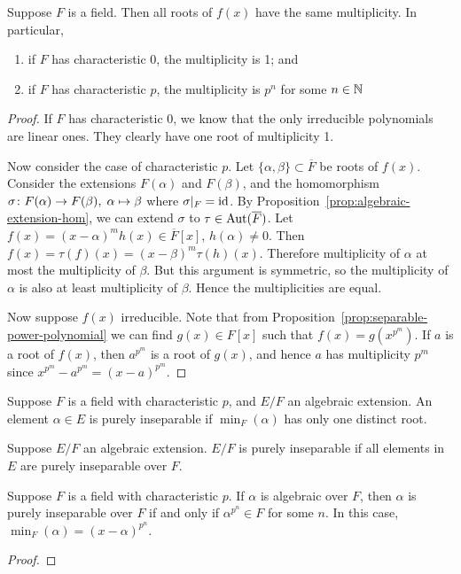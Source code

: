 \begin{proposition}
    Suppose \(F\) is a field.
    Then all roots of \(f(x)\) have the same multiplicity.
    In particular,
    \begin{enumerate}[label={(\alph*)}, itemsep=0mm]
        \item if \(F\) has characteristic 0, the multiplicity is 1; and
        \item if \(F\) has characteristic \(p\),
            the multiplicity is \(p^n\) for some \(n \in \mathbb{N}\)
    \end{enumerate}
\end{proposition}
\begin{proof}
    If \(F\) has characteristic 0,
    we know that the only irreducible polynomials are linear ones.
    They clearly have one root of multiplicity 1.

    Now consider the case of characteristic \(p\).
    Let \(\{\alpha,\beta\}\subset\overline{F}\) be roots of \(f(x)\).
    Consider the extensions \(F(\alpha)\) and \(F(\beta)\),
    and the homomorphism \(\sigma\colon F(\alpha)\to F(\beta),\;\alpha\mapsto\beta\)
    where \(\sigma\vert_F = \operatorname{id}\).
    By Proposition~\ref{prop:algebraic-extension-hom},
    we can extend \(\sigma\) to \(\tau\in\operatorname{Aut}(\overline{F})\).
    Let \(f(x) = {(x-\alpha)}^m h(x) \in \overline{F}[x]\), \(h(\alpha) \neq 0\).
    Then \(f(x) = \tau(f)(x) = {(x-\beta)}^m \tau(h)(x)\).
    Therefore multiplicity of \(\alpha\) at most the multiplicity of \(\beta\).
    But this argument is symmetric,
    so the multiplicity of \(\alpha\) is also at least multiplicity of \(\beta\).
    Hence the multiplicities are equal.

    Now suppose \(f(x)\) irreducible.
    Note that from Proposition~\ref{prop:separable-power-polynomial}
    we can find \(g(x) \in F[x]\) such that \(f(x) = g(x^{p^m})\).
    If \(a\) is a root of \(f(x)\), then \(a^{p^m}\) is a root of \(g(x)\),
    and hence \(a\) has multiplicity \(p^m\)
    since \(x^{p^m} - a^{p^m} = {(x-a)}^{p^m}\).
\end{proof}

\begin{definition}
    Suppose \(F\) is a field with characteristic \(p\),
    and \(E/F\) an algebraic extension.
    An element \(\alpha \in E\) is purely inseparable
    if \(\min_F(\alpha)\) has only one distinct root.
\end{definition}
\begin{definition}
    Suppose \(E/F\) an algebraic extension.
    \(E/F\) is purely inseparable
    if all elements in \(E\) are purely inseparable over \(F\).
\end{definition}
\begin{lemma}
    Suppose \(F\) is a field with characteristic \(p\).
    If \(\alpha\) is algebraic over \(F\),
    then \(\alpha\) is purely inseparable over \(F\)
    if and only if \(\alpha^{p^n} \in F\) for some \(n\).
    In this case, \(\min_F(\alpha) = {(x-\alpha)}^{p^n}\).
\end{lemma}
\begin{proof}
\end{proof}

